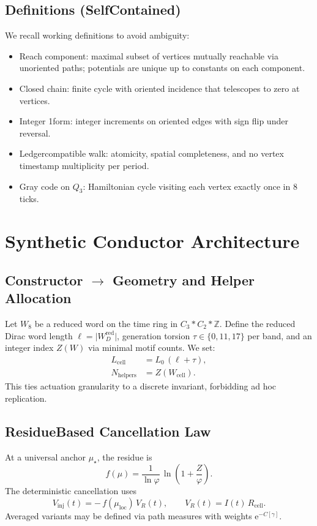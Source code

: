 \documentclass[11pt,a4paper]{article}
\newcommand{\ZZ}{\mathbb{Z}}
\newcommand{\e}{\mathrm{e}}
\newcommand{\paren}[1]{\left( #1 \right)}
\newcommand{\mus}{\mu_{\star}}
\begin{document}
\subsection{Definitions (Self\textendash Contained)}
We recall working definitions to avoid ambiguity:
\begin{itemize}
  \item Reach component: maximal subset of vertices mutually reachable via unoriented paths; potentials are unique up to constants on each component.
  \item Closed chain: finite cycle with oriented incidence that telescopes to zero at vertices.
  \item Integer 1\textendash form: integer increments on oriented edges with sign flip under reversal.
  \item Ledger\textendash compatible walk: atomicity, spatial completeness, and no vertex timestamp multiplicity per period.
  \item Gray code on \(Q_3\): Hamiltonian cycle visiting each vertex exactly once in 8 ticks.
\end{itemize}

\section{Synthetic Conductor Architecture}
\label{sec:architecture}
\subsection{Constructor \texorpdfstring{$\to$}{->} Geometry and Helper Allocation}
Let \(W_8\) be a reduced word on the time ring in \(C_3 * C_2 * \ZZ\). Define the reduced Dirac word length \(\ell=\lvert W_D^{\mathrm{red}}\rvert\), generation torsion \(\tau\in\{0,11,17\}\) per band, and an integer index \(Z(W)\) via minimal motif counts. We set:
\begin{align}
  L_{\mathrm{cell}} &= L_0\,(\ell + \tau), \\
  N_{\mathrm{helpers}} &= Z(W_{\mathrm{cell}}).\label{eq:helpers}
\end{align}
This ties actuation granularity to a discrete invariant, forbidding ad hoc replication.

\subsection{Residue\textendash Based Cancellation Law}
At a universal anchor \(\mus\), the residue is
\begin{equation}
  f(\mu) = \frac{1}{\ln \varphi}\,\ln\!\paren{1 + \frac{Z}{\varphi}}.\label{eq:residue}
\end{equation}
The deterministic cancellation uses
\begin{equation}
  V_{\mathrm{inj}}(t) = -\,f\!\paren{\mu_{\mathrm{loc}}}\,V_R(t),\qquad V_R(t)=I(t)\,R_{\mathrm{cell}}.\label{eq:control}
\end{equation}
Averaged variants may be defined via path measures with weights \(\e^{-C[\gamma]}\).
\end{document}

